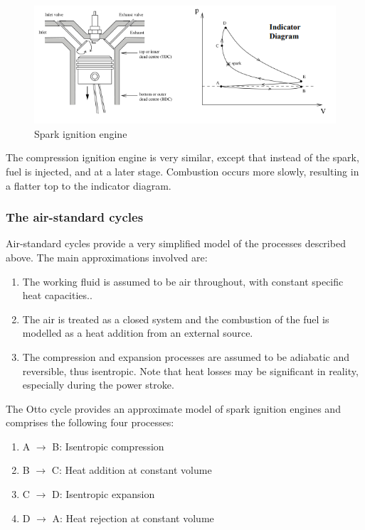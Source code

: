 \documentclass{article}
\begin{document}
\begin{figure}[h]
    \centering
    \includegraphics[width = \textwidth]{images/Screenshot 2024-04-03 170454.png}
    \caption{Spark ignition engine}
    \label{fig:enter-label}
\end{figure}

The compression ignition engine is very similar, except that instead of the spark, fuel is injected, and at a later stage. Combustion occurs more slowly, resulting in a flatter top to the indicator diagram.

\subsubsection{The air-standard cycles}

Air-standard cycles provide a very simplified model of the processes described above. The main approximations involved are:

\begin{enumerate}
    \item The working fluid is assumed to be air throughout, with constant specific heat capacities..
    \item The air is treated as a closed system and the combustion of the fuel is modelled as a heat addition from an external source.
    \item The compression and expansion processes are assumed to be adiabatic and reversible, thus isentropic. Note that heat losses may be significant in reality, especially during the power stroke.
\end{enumerate}

\begin{proposition}
    The Otto cycle provides an approximate model of spark ignition engines and comprises the following four processes:

    \begin{enumerate}
        \item A $\to$ B: Isentropic compression
        \item B $\to$ C: Heat addition at constant volume
        \item C $\to$ D: Isentropic expansion
        \item D $\to$ A: Heat rejection at constant volume
    \end{enumerate}

\end{proposition}
\end{document}
